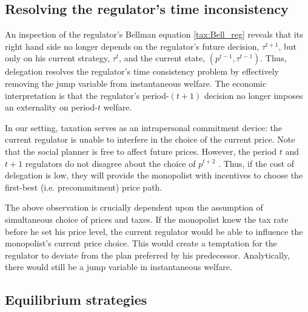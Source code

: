 \subsection{Resolving the regulator's time inconsistency}

\label{sec:time-cons-strat}

An inspection of the regulator's Bellman equation \eqref{tax:Bell_reg}
reveals that its right hand side no longer depends on the regulator's future
decision, $\tau ^{t+1}$, but only on his current strategy, $\tau ^{t}$, and
the current state, $(p^{t-1},\tau ^{t-1})$. Thus, delegation resolves the
regulator's time consistency problem by effectively removing the jump
variable from instantaneous welfare. The economic interpretation is that the
regulator's period-$(t+1)$ decision no longer imposes an externality on
period-$t$ welfare.

In our setting, taxation serves as an intrapersonal commitment device: the
current regulator is unable to interfere in the choice of the current price.
Note that the social planner is free to affect future prices. However, the
period $t$ and $t+1$ regulators do not disagree about the choice of $p^{t+2}$%
. Thus, if the cost of delegation is low, they will provide the monopolist
with incentives to choose the first-best (i.e. precommitment)  price path.

The above observation is crucially dependent upon the assumption of
simultaneous choice of prices and taxes. If the monopolist knew the tax rate
before he set his price level, the current regulator would be able to
influence the monopolist's current price choice. This would create a
temptation for the regulator to deviate from the plan preferred by his
predecessor. Analytically, there would still be a jump variable in
instantaneous welfare.

\subsection{Equilibrium strategies}

\label{sec:equil-strat}

